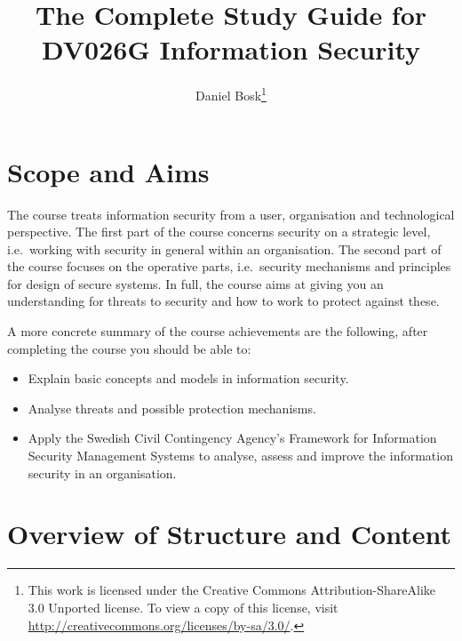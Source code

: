 \documentclass[a4paper,logo]{miunart}
\title{%
  The Complete Study Guide for\\
  DV026G Information Security
}
\author{Daniel Bosk\footnote{%
  This work is licensed under the Creative Commons Attribution-ShareAlike 3.0 
  Unported license.
	To view a copy of this license, visit 
	\url{http://creativecommons.org/licenses/by-sa/3.0/}.
}}
\date{\svnId}
\begin{document}
\maketitle
\tableofcontents


\section{Scope and Aims}
\label{sec:aim}
The course treats information security from a user, organisation and 
technological perspective.
The first part of the course concerns security on a strategic level, 
i.e.~working with security in general within an organisation.
The second part of the course focuses on the operative parts, i.e.~security 
mechanisms and principles for design of secure systems.
In full, the course aims at giving you an understanding for threats to security 
and how to work to protect against these.

A more concrete summary of the course achievements are the following, after 
completing the course you should be able to:
\begin{itemize}
%  
%  
%  
%  
%  
%  
%  
  \item Explain basic concepts and models in information security.
  \item Analyse threats and possible protection mechanisms.
  \item Apply the Swedish Civil Contingency Agency's Framework for Information 
    Security Management Systems to analyse, assess and improve the information 
    security in an organisation.
\end{itemize}


\section{Overview of Structure and Content}
\label{sec:outline}
%
%
\end{document}
